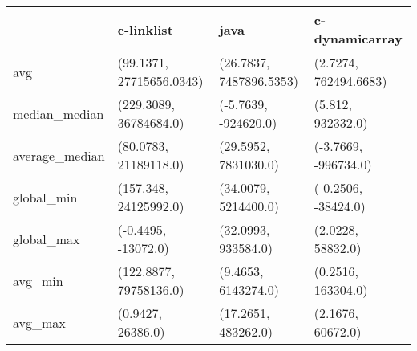 \begin{tabular}{llll}
\toprule
{} &                c-linklist &                     java &         c-dynamicarray \\
\midrule
avg            &  (99.1371, 27715656.0343) &  (26.7837, 7487896.5353) &  (2.7274, 762494.6683) \\
median\_median  &    (229.3089, 36784684.0) &     (-5.7639, -924620.0) &      (5.812, 932332.0) \\
average\_median &     (80.0783, 21189118.0) &     (29.5952, 7831030.0) &   (-3.7669, -996734.0) \\
global\_min     &     (157.348, 24125992.0) &     (34.0079, 5214400.0) &    (-0.2506, -38424.0) \\
global\_max     &       (-0.4495, -13072.0) &      (32.0993, 933584.0) &      (2.0228, 58832.0) \\
avg\_min        &    (122.8877, 79758136.0) &      (9.4653, 6143274.0) &     (0.2516, 163304.0) \\
avg\_max        &         (0.9427, 26386.0) &      (17.2651, 483262.0) &      (2.1676, 60672.0) \\
\bottomrule
\end{tabular}
